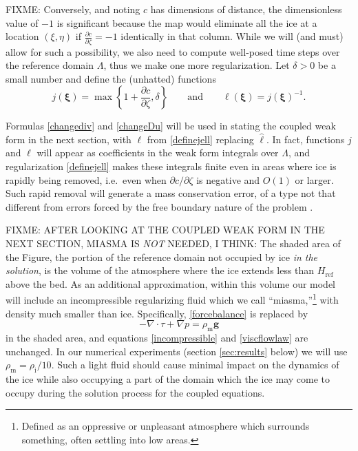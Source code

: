 \documentclass[letterpaper,final,12pt,reqno]{amsart}
\newcommand{\bg}{\mathbf{g}}
\newcommand{\bxi}{\bm{\xi}}
\newcommand{\rhoi}{\rho_{\text{i}}}
\newcommand{\Href}{H_{\text{ref}}}
\newcommand{\rhom}{\rho_{\text{m}}}
\begin{document}
FIXME: Conversely, and noting $c$ has dimensions of distance, the dimensionless value of $-1$ is significant because the map would eliminate all the ice at a location $(\xi,\eta)$ if $\frac{\partial c}{\partial \zeta}=-1$ identically in that column.  While we will (and must) allow for such a possibility, we also need to compute well-posed time steps over the reference domain $\Lambda$, thus we make one more regularization.  Let $\delta > 0$ be a small number and define the (unhatted) functions
\begin{equation}
j(\bxi) = \max\left\{1+\frac{\partial c}{\partial \zeta}, \delta\right\} \qquad \text{and} \qquad \ell(\bxi) = j(\bxi)^{-1}. \label{definejell}
\end{equation}

Formulas \eqref{changediv} and \eqref{changeDu} will be used in stating the coupled weak form in the next section, with $\ell$ from \eqref{definejell} replacing $\hat\ell$.  In fact, functions $j$ and $\ell$ will appear as coefficients in the weak form integrals over $\Lambda$, and regularization \eqref{definejell} makes these integrals finite even in areas where ice is rapidly being removed, i.e.~even when $\partial c/\partial \zeta$ is negative and $O(1)$ or larger.  Such rapid removal will generate a mass conservation error, of a type not that different from errors forced by the free boundary nature of the problem \cite{Bueler2020}.

FIXME: AFTER LOOKING AT THE COUPLED WEAK FORM IN THE NEXT SECTION, MIASMA IS \emph{NOT} NEEDED, I THINK: The shaded area of the Figure, the portion of the reference domain not occupied by ice \emph{in the solution}, is the volume of the atmosphere where the ice extends less than $\Href$ above the bed.  As an additional approximation, within this volume our model will include an incompressible regularizing fluid which we call ``miasma,''\footnote{Defined as an oppressive or unpleasant atmosphere which surrounds something, often settling into low areas.} with density much smaller than ice.  Specifically, \eqref{forcebalance} is replaced by
\begin{equation}
- \nabla \cdot \tau + \nabla p = \rhom \bg \label{miasma}
\end{equation}
in the shaded area, and equations \eqref{incompressible} and \eqref{viscflowlaw} are unchanged.  In our numerical experiments (section \ref{sec:results} below) we will use $\rhom = \rhoi/10$.  Such a light fluid should cause minimal impact on the dynamics of the ice while also occupying a part of the domain which the ice may come to occupy during the solution process for the coupled equations.
\end{document}
